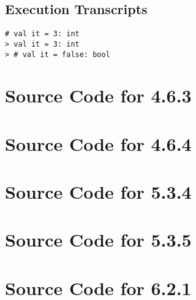 \documentclass[twoside]{report}
\begin{document}
\section{Execution Transcripts}
\begin{scriptsize}
    \begin{verbatim}
# val it = 3: int
> val it = 3: int
> # val it = false: bool
    \end{verbatim}
\end{scriptsize}

\appendix{}
\chapter{Source Code for 4.6.3}
\label{cha:apdx-a}
%

\chapter{Source Code for 4.6.4}
\label{cha:apdx-b}
%

\chapter{Source Code for 5.3.4}
\label{cha:apdx-c}
%

\chapter{Source Code for 5.3.5}
\label{cha:apdx-d}
%

\chapter{Source Code for 6.2.1}
\label{cha:apdx-e}
%
\end{document}
